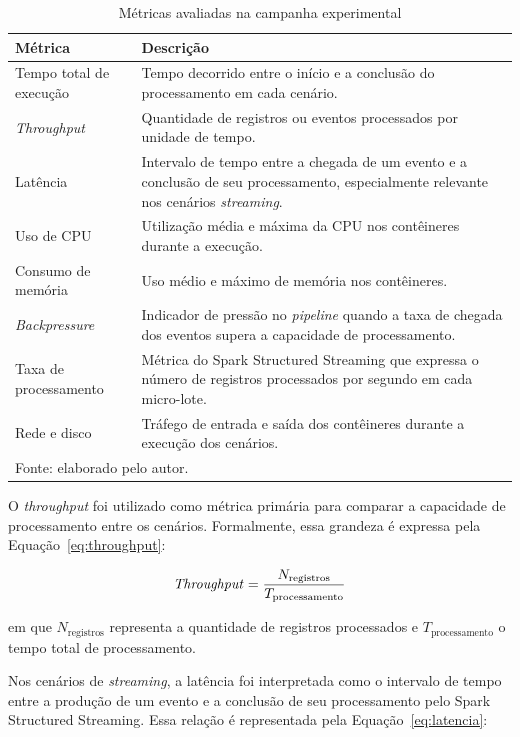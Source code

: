 \begin{table}[htbp]
\centering
\caption{Métricas avaliadas na campanha experimental}
\label{tab:metricas-experimento}
\small
\setlength{\tabcolsep}{6pt}
\renewcommand{\arraystretch}{1.35}
\begin{tabular}{p{4.8cm} p{7.8cm}}
\toprule
\textbf{Métrica} & \textbf{Descrição} \\
\midrule
Tempo total de execução  & Tempo decorrido entre o início e a conclusão do processamento em cada cenário. \\
\textit{Throughput}      & Quantidade de registros ou eventos processados por unidade de tempo. \\
Latência                 & Intervalo de tempo entre a chegada de um evento e a conclusão de seu processamento, especialmente relevante nos cenários \textit{streaming}. \\
Uso de CPU               & Utilização média e máxima da CPU nos contêineres durante a execução. \\
Consumo de memória       & Uso médio e máximo de memória nos contêineres. \\
\textit{Backpressure}    & Indicador de pressão no \textit{pipeline} quando a taxa de chegada dos eventos supera a capacidade de processamento. \\
Taxa de processamento    & Métrica do Spark Structured Streaming que expressa o número de registros processados por segundo em cada micro-lote. \\
Rede e disco             & Tráfego de entrada e saída dos contêineres durante a execução dos cenários. \\
\bottomrule
\multicolumn{2}{l}{\footnotesize Fonte: elaborado pelo autor.}
\end{tabular}
\end{table}
 
O \textit{throughput} foi utilizado como métrica primária para comparar a capacidade de processamento entre os cenários. Formalmente, essa grandeza é expressa pela Equação~\ref{eq:throughput}:
 
\begin{equation}
\text{\textit{Throughput}} = \frac{N_{\text{registros}}}{T_{\text{processamento}}}
\label{eq:throughput}
\end{equation}
 
\noindent em que $N_{\text{registros}}$ representa a quantidade de registros processados e $T_{\text{processamento}}$ o tempo total de processamento.
 
Nos cenários de \textit{streaming}, a latência foi interpretada como o intervalo de tempo entre a produção de um evento e a conclusão de seu processamento pelo Spark Structured Streaming. Essa relação é representada pela Equação~\ref{eq:latencia}:
 
